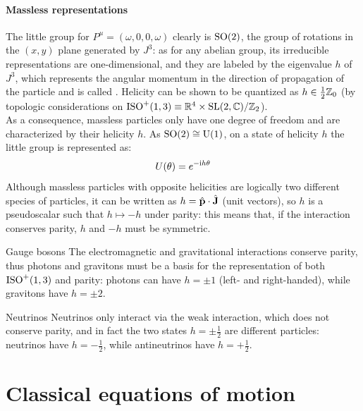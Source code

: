 \paragraph{Massless representations}

The little group for $ P^\mu = (\omega,0,0,\omega) $ clearly is $ \mathrm{SO}(2) $, the group of rotations in the $ (x,y) $ plane generated by $ J^3 $: as for any abelian group, its irreducible representations are one-dimensional, and they are labeled by the eigenvalue $ h $ of $ J^3 $, which represents the angular momentum in the direction of propagation of the particle and is called . Helicity can be shown to be quantized as $ h \in \frac{1}{2}\mathbb{Z}_0 $ (by topologic considerations on $ \mathrm{ISO}^+(1,3) \equiv \mathbb{R}^4 \times \mathrm{SL}(2,\mathbb{C}) / \mathbb{Z}_2 $).\\
As a consequence, massless particles only have one degree of freedom and are characterized by their helicity $ h $. As $ \mathrm{SO}(2) \cong \mathrm{U}(1) $, on a state of helicity $ h $ the little group is represented as:
\begin{equation}
  U(\theta) = e^{-\mathrm{i} h \theta}
\end{equation}
Although massless particles with opposite helicities are logically two different species of particles, it can be written as $ h = \hat{\mathbf{p}} \cdot \hat{\mathbf{J}} $ (unit vectors), so $ h $ is a pseudoscalar such that $ h \mapsto -h $ under parity: this means that, if the interaction conserves parity, $ h $ and $ -h $ must be symmetric.

\begin{example}{Gauge bosons}{}
  The electromagnetic and gravitational interactions conserve parity, thus photons and gravitons must be a basis for the representation of both $ \mathrm{ISO}^+(1,3) $ and parity: photons can have $ h = \pm 1 $ (left- and right-handed), while gravitons have $ h = \pm 2 $.
\end{example}

\begin{example}{Neutrinos}{}
  Neutrinos only interact via the weak interaction, which does not conserve parity, and in fact the two states $ h = \pm \frac{1}{2} $ are different particles: neutrinos have $ h = - \frac{1}{2} $, while antineutrinos have $ h = + \frac{1}{2} $.
\end{example}

\newpage
\section{Classical equations of motion}

